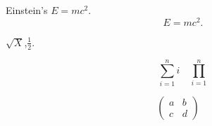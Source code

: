 \documentclass{article}
\begin{document}
Einstein's $E=mc^2$.
\[ E=mc^2. \]    

$\sqrt{X}$,$\frac{1}{2}$.

\[ \sum_{i=1}^n i\quad \prod_{i=1}^n \]


\[ \begin{pmatrix} a&b\\c&d \end{pmatrix} \quad \]
\end{document}
